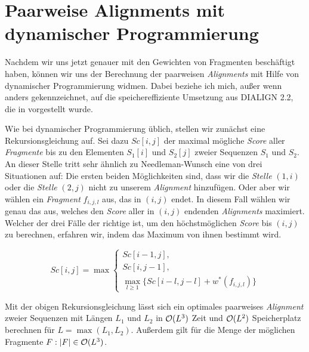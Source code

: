 \section{Paarweise Alignments mit dynamischer Programmierung}

Nachdem wir uns jetzt genauer mit den Gewichten von Fragmenten beschäftigt haben, können wir uns der Berechnung der paarweisen \emph{Alignments} mit Hilfe von dynamischer Programmierung widmen. Dabei beziehe ich mich, außer wenn anders gekennzeichnet, auf die speichereffiziente Umsetzung aus DIALIGN 2.2, die in \cite{m02} vorgestellt wurde. 

Wie bei dynamischer Programmierung üblich, stellen wir zunächst eine Rekursionsgleichung auf. Sei dazu $Sc[i,j]$ der maximal mögliche \emph{Score} aller \emph{Fragmente} bis zu den Elementen $S_1[i]$ und $S_2[j]$ zweier Sequenzen $S_1$ und $S_2$. An dieser Stelle tritt sehr ähnlich zu Needleman-Wunsch eine von drei Situationen auf: Die ersten beiden Möglichkeiten sind, dass wir die \emph{Stelle} $(1,i)$ oder die \emph{Stelle} $(2,j)$ nicht zu unserem \emph{Alignment} hinzufügen. Oder aber wir wählen ein \emph{Fragment} $f_{i,j,l}$ aus, das in $(i,j)$ endet. In diesem Fall wählen wir genau das aus, welches den \emph{Score} aller in $(i,j)$ endenden \emph{Alignments} maximiert. Welcher der drei Fälle der richtige ist, um den höchstmöglichen \emph{Score} bis $(i,j)$ zu berechnen, erfahren wir, indem das Maximum von ihnen bestimmt wird.

\begin{equation}\label{eq:dp_score2}
	Sc[i,j] = \max
	\begin{cases}
		Sc[i-1,j], \\
		Sc[i,j-1], \\
		\max_{l\geq 1}\{Sc[i\!-\!l,j\!-\!l] + w^*(f_{i,j,l})\}
	\end{cases}
\end{equation}

\begin{satz}
	Mit der obigen Rekursionsgleichung lässt sich ein optimales paarweises \emph{Alignment} zweier Sequenzen mit Längen $L_1$ und $L_2$ in $\mathcal{O}(L^3)$ Zeit und $\mathcal{O}(L^2)$ Speicherplatz berechnen für $L = \max(L_1, L_2)$. Außerdem gilt für die Menge der möglichen Fragmente $F: |F| \in \mathcal{O}(L^3)$.
\end{satz}
	
